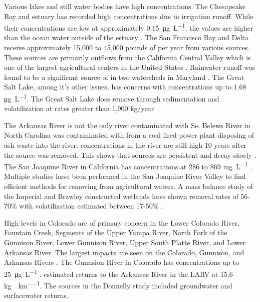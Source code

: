 \begin{linenumbers}[1]
Various lakes and still water bodies have high \Se concentrations.  The Chesapeake Bay and estuary has recorded high \Se concentrations due to irrigation runoff.  While their concentrations are low at approximately \SI{0.15}{\micro\g\per\liter}, the values are higher than the ocean water outside of the estuary \parencite{Takayanagi1984}.  The San Francisco Bay and Delta receive approximately 15,000 to 45,000 pounds of \Se per year from various sources.  These sources are primarily outflows from the California Central Valley which is one of the largest agricultural centers in the United States \parencite{2000luoma}.  Rainwater runoff was found to be a significant source of \Se in two watersheds in Maryland \parencite{Lawson2001}.  The Great Salt Lake, among it's other issues, has \Se concerns with concentrations up to 1.68 \si{\micro\g\per\liter}.  The Great Salt Lake does remove \Se through sedimentation and volatilization at rates greater than 1,900 kg/year \parencite{2008naftz,oliver2009}

The Arkansas River is not the only river contaminated with Se.  Belews River in North Carolina was contaminated with \Se from a coal fired power plant disposing of ash waste into the river.  \Se concentrations in the river are still high 10 years after the source was removed.  This shows that \Se sources are persistent and decay slowly \parencite{Lemly2002}.   The San Joaquine River in California has \Se concentrations at 286 to 869 \si{\milli\g\per\liter} \parencite{Clifton1989}.  Multiple studies have been performed in the San Joaquine River Valley to find efficient methods for removing \Se from agricultural waters.  A mass balance study of the Imperial and Brawley constructed wetlands have shown removal rates of 56-70\% with volatilization estimated between 17-50\% \parencite{Gersberg2006}.

High \Se levels in Colorado are of primary concern in the Lower Colorado River, Fountain Creek, Segments of the Upper Yampa River, North Fork of the Gunnison River, Lower Gunnison River, Upper South Platte River, and Lower Arkansas River.  The largest impacts are seen on the Colorado, Gunnison, and Arkansas Rivers \parencite{5CCR1002-93}.  The Gunnsion River in Colorado has \Se concentrations up to \SI{25}{\micro\g\per\liter} \parencite{2008USBR}.  \textcite{2005Donnelly} estimated \Se returns to the Arkansas River in the LARV at 15.6 \si{\kilo\g\per\year\per\kilo\meter}.  The sources in the Donnelly study included groundwater and surfacewater returns.


\end{linenumbers}

